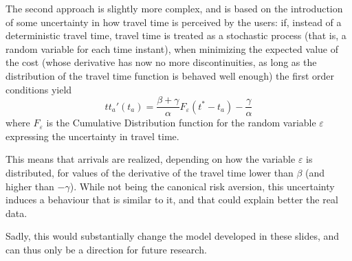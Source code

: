 The second approach is slightly more complex, and is based on the introduction of some uncertainty in how travel time is perceived by the users:
if, instead of a deterministic travel time,
travel time is treated as a stochastic process (that is, a random variable for each time instant),
when minimizing the expected value of the cost (whose derivative has now no more discontinuities, as long as the distribution of the travel time function is behaved well enough)
the first order conditions yield
\begin{equation*}
  tt_a'(t_a) = \frac{\beta + \gamma}{\alpha}F_\varepsilon(t^* - t_a) - \frac{\gamma}{\alpha}
\end{equation*}
where \(F_\varepsilon\) is the Cumulative Distribution function for the random variable \(\varepsilon\) expressing the uncertainty in travel time.

This means that arrivals are realized, depending on how the variable \(\varepsilon\) is distributed,
for values of the derivative of the travel time lower than \(\beta\) (and higher than \(-\gamma\)).
While not being the canonical risk aversion,
this uncertainty induces a behaviour that is similar to it,
and that could explain better the real data.

Sadly, this would substantially change the model developed in these slides,
and can thus only be a direction for future research.

